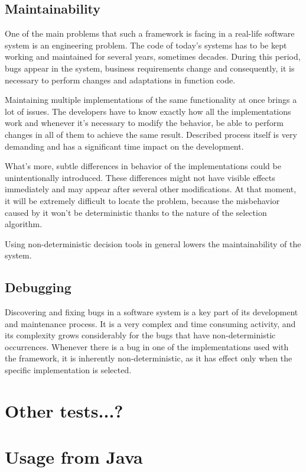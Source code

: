 \subsection{Maintainability}

One of the main problems that such a framework is facing in a real-life software system is an engineering problem. The code of today's systems has to be kept working and maintained for several years, sometimes decades. During this period, bugs appear in the system, business requirements change and consequently, it is necessary to perform changes and adaptations in function code.

Maintaining multiple implementations of the same functionality at once brings a lot of issues. The developers have to know exactly how all the implementations work and whenever it's necessary to modify the behavior, be able to perform changes in all of them to achieve the same result. Described process itself is very demanding and has a significant time impact on the development. 

What's more, subtle differences in behavior of the implementations could be unintentionally introduced. These differences might not have visible effects immediately and may appear after several other modifications. At that moment, it will be extremely difficult to locate the problem, because the misbehavior caused by it won't be deterministic thanks to the nature of the selection algorithm.

Using non-deterministic decision tools in general lowers the maintainability of the system.

\subsection{Debugging}

Discovering and fixing bugs in a software system is a key part of its development and maintenance process. It is a very complex and time consuming activity, and its complexity grows considerably for the bugs that have non-deterministic occurrences. Whenever there is a bug in one of the implementations used with the framework, it is inherently non-deterministic, as it has effect only when the specific implementation is selected.

\section{Other tests...?}

\section{Usage from Java}

